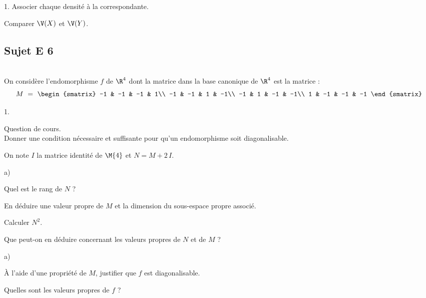 \documentclass[11pt]{article}%
\begin{document}
\begin{exerciceSP}
\begin{noliste}{1.}
   Associer chaque densité à la \var correspondante.
   
   \item Comparer $\V(X)$ et $\V(Y)$.
 \end{noliste}
\end{exerciceSP}


\subsection*{Sujet E 6}

\begin{exerciceAP}~\\
  On considère l'endomorphisme $f$ de $\R^4$ dont la matrice dans la
  base canonique de $\R^4$ est la matrice :
  \[
    M \ = \
    \begin{smatrix}
      -1 & -1 & -1 & 1\\
      -1 & -1 & 1 & -1\\
      -1 & 1 & -1 & -1\\
      1 & -1 & -1 & -1
    \end{smatrix}
  \]
  \begin{noliste}{1.}
  \item Question de cours.\\
    Donner une condition nécessaire et suffisante pour qu'un
    endomorphisme soit diagonalisable.
    
  \item On note $I$ la matrice identité de $\M{4}$ et $N=M+2 \, I$.
    \begin{noliste}{a)}
    \item Quel est le rang de $N$ ?
      
    \item En déduire une valeur propre de $M$ et la dimension du
      sous-espace propre associé.
      
    \item Calculer $N^2$.
      
    \item Que peut-on en déduire concernant les valeurs propres de $N$
      et de $M$ ?
    \end{noliste}
    
  \item
    \begin{noliste}{a)}
    \item À l'aide d'une propriété de $M$, justifier que $f$ est
      diagonalisable.
      
    \item Quelles sont les valeurs propres de $f$ ?
      

\end{noliste}
\end{noliste}
\end{exerciceAP}
\end{document}
